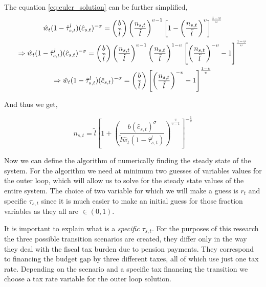 The equation \textcolor{Fuchsia}{\eqref{eq:euler_solution}} can be further simplified,
\begin{equation}\notag
    \begin{gathered}
        \hat{w}_t(1-\hat{\tau}^l_{s,t})(\hat{c}_{s,t})^{-\sigma} = \left( \frac{b}{\tilde{l}} \right) \left( \frac{n_{s,t}}{\tilde{l}} \right)^{\upsilon - 1} \left[ 1- \left( \frac{n_{s,t}}{\tilde{l}} \right)^{\upsilon} \right]^{\frac{1-\upsilon}{\upsilon}}
        \\
        \Rightarrow \hat{w}_t(1-\hat{\tau}^l_{s,t})(\hat{c}_{s,t})^{-\sigma} = \left( \frac{b}{\tilde{l}} \right) \left( \frac{n_{s,t}}{\tilde{l}} \right)^{\upsilon - 1} \left( \frac{n_{s,t}}{\tilde{l}} \right)^{1 - \upsilon} \left[ \left( \frac{n_{s,t}}{\tilde{l}} \right)^{-\upsilon} - 1 \right]^{\frac{1-\upsilon}{\upsilon}}
        \\
        \Rightarrow \hat{w}_t(1-\hat{\tau}^l_{s,t})(\hat{c}_{s,t})^{-\sigma} =  \left( \frac{b}{\tilde{l}} \right) \left[ \left( \frac{n_{s,t}}{\tilde{l}} \right)^{-\upsilon} - 1 \right]^{\frac{1-\upsilon}{\upsilon}}
    \end{gathered}
\end{equation}

And thus we get,

\begin{equation}\label{eq:labour_function_explicit}
    n_{s,t} = \tilde{l} \left[ 1 + \left( \frac{b(\hat{c}_{s,t})^{\sigma}}{\tilde{l}\hat{w}_t (1-\hat{\tau}^l_{s,t})} \right)^{\frac{\upsilon}{\upsilon - 1}} \right]^{-\frac{1}{\upsilon}}
\end{equation}

Now we can define the algorithm of numerically finding the steady state of the system. For the algorithm we need at minimum two guesses of variables values for the outer loop, which will allow us to solve for the steady state values of the entire system. The choice of two variable for which we will make a guess is $r_t$ and specific $\tau_{s,t}$ since it is much easier to make an initial guess for those fraction variables as they all are $\in (0, 1)$.

It is important to explain what is a \textit{specific} $\tau_{s,t}$. For the purposes of this research the three possible transition scenarios are created, they differ only in the way they deal with the fiscal tax burden due to pension payments. They correspond to financing the budget gap by three different taxes, all of which use just one tax rate. Depending on the scenario and a specific tax financing the transition we choose a tax rate variable for the outer loop solution.

